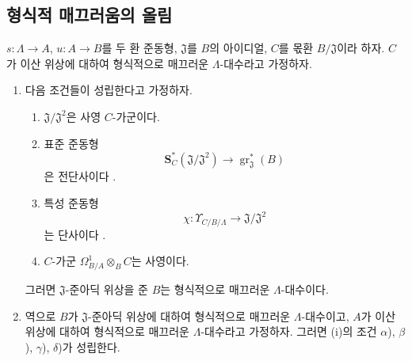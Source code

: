 
\subsection{형식적 매끄러움의 올림}
\label{subsection:0.22.1-ko}
\label{0.22.1-ko}

\begin{theorem}[22.1.1]
\label{0.22.1.1-ko}
$s:\Lambda\to A$, $u:A\to B$를 두 환 준동형, $\mathfrak J$를 $B$의
아이디얼, $C$를 몫환 $B/\mathfrak J$이라 하자. $C$가 이산 위상에
대하여 형식적으로 매끄러운 $\Lambda$-대수라고 가정하자.
\begin{enumerate}
  \item[\rm(i)] 다음 조건들이 성립한다고 가정하자.
  \begin{enumerate}
    \item[$\alpha$)] $\mathfrak J/\mathfrak J^2$은 사영 $C$-가군이다.
    \item[$\beta$)] 표준 준동형
    \[
      \mathbf S_C^*(\mathfrak J/\mathfrak J^2)
      \longrightarrow \operatorname{gr}_{\mathfrak J}^*(B)
    \]
    은 전단사이다 .
    \item[$\gamma$)] 특성 준동형
    \[
      \chi:\Upsilon_{C/B/\Lambda}\longrightarrow
      \mathfrak J/\mathfrak J^2
    \]
    는 단사이다 .
    \item[$\delta$)] $C$-가군 $\Omega^1_{B/A}\otimes_BC$는 사영이다.
  \end{enumerate}
  그러면 $\mathfrak J$-준아딕 위상을 준 $B$는 형식적으로 매끄러운
  $\Lambda$-대수이다.

  \item[\rm(ii)] 역으로 $B$가 $\mathfrak J$-준아딕 위상에 대하여
  형식적으로 매끄러운 $\Lambda$-대수이고, $A$가 이산 위상에 대하여
  형식적으로 매끄러운 $\Lambda$-대수라고 가정하자. 그러면 (i)의 조건
  $\alpha$), $\beta$), $\gamma$), $\delta$)가 성립한다.
\end{enumerate}
\end{theorem}

